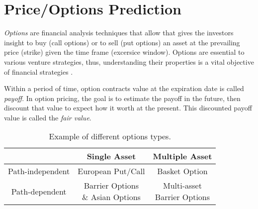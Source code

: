 \section{Price/Options Prediction} \label{Sec: Price Prediction}
\emph{Options} are financial analysis techniques that allow that gives the investors insight to buy (call options) or to sell (put options) an asset at the prevailing price (strike) given the time frame (excersice window).
Options are essential to various venture strategies, thus, understanding their properties is a vital objective of financial strategies \cite{kariyaOptionsFuturesOther2003}.

Within a period of time, option contracts value at the expiration date is called \emph{payoff}.
In option pricing, the goal is to estimate the payoff in the future, then discount that value to expect how it worth at the present.
This discounted payoff value is called the \emph{fair value}.

\begin{table*}
    \centering
    \begin{tabular}{||c c c||}
        \hline
                         & Single Asset              & Multiple Asset \\
        \hline\hline
        Path-independent & European Put/Call         & Basket Option  \\
        Path-dependent   & \makecell{Barrier Options                  \\ \& Asian Options} & \makecell{Multi-asset \\ Barrier Options} \\
        \hline
    \end{tabular}
    \caption{Example of different options types.}
\end{table*}